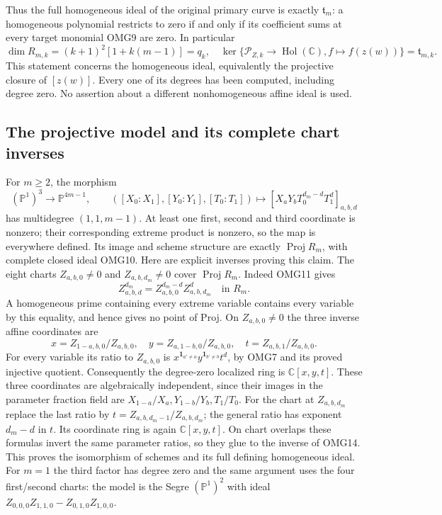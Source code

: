 \documentclass[11pt,a4paper]{article}
\begin{document}
Thus the full homogeneous ideal of the original primary curve is
exactly $\mathfrak t_m$: a homogeneous polynomial restricts to zero
if and only if its coefficient sums at every target monomial OMG9
are zero. In particular
\[
 \boxed{\dim R_{m,k}=(k+1)^2[1+k(m-1)]=q_k,
 \quad\ker\{\mathscr P_{Z,k}\to\operatorname{Hol}(\mathbb C),
                      f\mapsto f(z(w))\}=\mathfrak t_{m,k}.}
 \tag{OMG13}
\]
This statement concerns the homogeneous ideal, equivalently the
projective closure of $[z(w)]$. Every one of its degrees has been
computed, including degree zero. No assertion about a different
nonhomogeneous affine ideal is used.

\subsection{The projective model and its complete chart inverses}
For $m\ge2$, the morphism
\[
 (\mathbb P^1)^3\longrightarrow\mathbb P^{4m-1},\qquad
 ([X_0:X_1],[Y_0:Y_1],[T_0:T_1])
      \longmapsto[X_aY_bT_0^{d_m-d}T_1^d]_{a,b,d}
 \tag{OMG14}
\]
has multidegree $(1,1,m-1)$. At least one first, second and third
coordinate is nonzero; their corresponding extreme product is
nonzero, so the map is everywhere defined. Its image and scheme
structure are exactly $\operatorname{Proj}R_m$, with complete
closed ideal OMG10. Here are explicit inverses proving this claim.
The eight charts $Z_{a,b,0}\ne0$ and $Z_{a,b,d_m}\ne0$ cover
$\operatorname{Proj}R_m$. Indeed OMG11 gives
\[
 Z_{a,b,d}^{d_m}=Z_{a,b,0}^{d_m-d}Z_{a,b,d_m}^{d}
             \quad\text{in }R_m.
\]
A homogeneous prime containing every extreme variable contains
every variable by this equality, and hence gives no point of Proj.
On $Z_{a,b,0}\ne0$ the three inverse affine coordinates are
\[
 x=Z_{1-a,b,0}/Z_{a,b,0},\quad
 y=Z_{a,1-b,0}/Z_{a,b,0},\quad
 t=Z_{a,b,1}/Z_{a,b,0}.
\]
For every variable its ratio to $Z_{a,b,0}$ is
$x^{\mathbf1_{a'\ne a}}y^{\mathbf1_{b'\ne b}}t^d$, by OMG7
and its proved injective quotient. Consequently the degree-zero
localized ring is $\mathbb C[x,y,t]$. These three coordinates
are algebraically independent, since their images in the parameter
fraction field are $X_{1-a}/X_a,Y_{1-b}/Y_b,T_1/T_0$.
For the chart at $Z_{a,b,d_m}$ replace the last ratio by
$t=Z_{a,b,d_m-1}/Z_{a,b,d_m}$; the general ratio has exponent
$d_m-d$ in $t$. Its coordinate ring is again $\mathbb C[x,y,t]$.
On chart overlaps these formulas invert the same parameter ratios,
so they glue to the inverse of OMG14. This proves the isomorphism
of schemes and its full defining homogeneous ideal. For $m=1$
the third factor has degree zero and the same argument uses the
four first/second charts: the model is the Segre $(\mathbb P^1)^2$
with ideal $Z_{0,0,0}Z_{1,1,0}-Z_{0,1,0}Z_{1,0,0}$.
\end{document}
